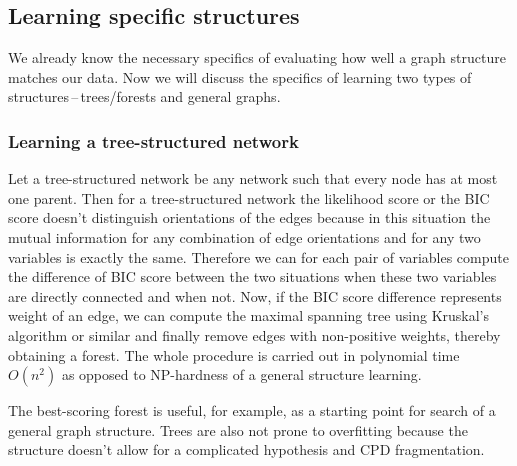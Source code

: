 \documentclass[english,cover]{fitthesis} %
\begin{document}
\subsection{Learning specific structures}
We already know the necessary specifics of evaluating how well a graph structure matches our data. Now we will discuss the specifics of learning two types of structures\,--\,trees/forests and general graphs. 

\subsubsection{Learning a tree-structured network}
Let a tree-structured network be any network such that every node has at most one parent. Then for a tree-structured network the likelihood score or the BIC score doesn't distinguish orientations of the edges because in this situation the mutual information for any combination of edge orientations and for any two variables is exactly the same. Therefore we can for each pair of variables compute the difference of BIC score between the two situations when these two variables are directly connected and when not. Now, if the BIC score difference represents weight of an edge, we can compute the maximal spanning tree using Kruskal's algorithm or similar and finally remove edges with non-positive weights, thereby obtaining a forest. The whole procedure is carried out in polynomial time $O(n^2)$ as opposed to NP-hardness of a general structure learning.

The best-scoring forest is useful, for example, as a starting point for search of a general graph structure. Trees are also not prone to overfitting because the structure doesn't allow for a complicated hypothesis and CPD fragmentation.
\end{document}
